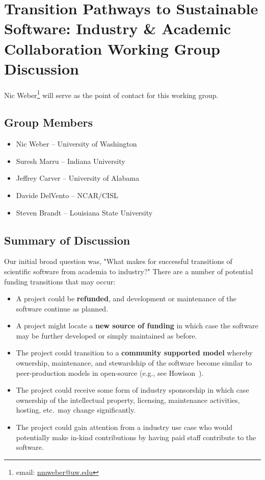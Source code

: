 \section{Transition Pathways to Sustainable Software: Industry \& Academic Collaboration Working Group Discussion}
\label{sec:appendix_industry_interaction}

Nic Weber\footnote{email: \href{mailto:nmweber@uw.edu}{nmweber@uw.edu}} will serve as the point of contact for this working group.

\subsection{Group Members}

\begin{itemize}
\item Nic Weber -- University of Washington
\item Suresh Marru -- Indiana University
\item Jeffrey Carver -- University of Alabama
\item Davide DelVento -- NCAR/CISL
\item Steven Brandt -- Louisiana State University
\end{itemize} 

\subsection{Summary of Discussion}

Our initial broad question was, "What makes for successful transitions of scientific software from academia to industry?" There are a number of potential funding transitions that may occur:  
%
\begin{itemize}

\item A project could be \textbf{refunded}, and development or maintenance of
the software continue as planned.

\item A project might locate a \textbf{new source of funding} in which case the
software may be further developed or simply maintained as before.

\item The project could transition to a \textbf{community supported model}
whereby ownership, maintenance, and stewardship of the software become similar
to peer-production models in open-source (e.g., see Howison~\cite{howison_sustaining_2015}).

\item The project could receive some form of industry sponsorship in which case
ownership of the intellectual property, licensing, maintenance activities,
hosting, etc.\ may change significantly.

\item The project could gain attention from a industry use case who would potentially make in-kind
contributions by having paid staff contribute to the software.

\end{itemize}

